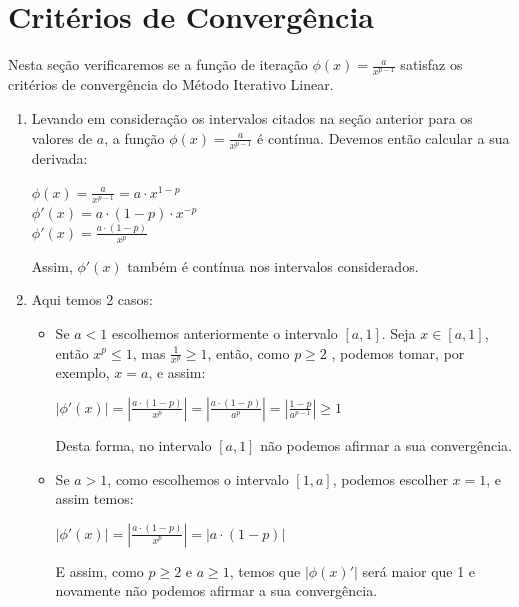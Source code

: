 \documentclass[11pt, openright, a4paper, brazil, openany, oneside]{abntex2}
\begin{document}
\section{Critérios de Convergência}

Nesta seção verificaremos se a função de iteração $ \phi (x) = \frac{a}{x^{p-1}} $ satisfaz os critérios de convergência do Método Iterativo Linear.

\begin{enumerate}

\item Levando em consideração os intervalos citados na seção anterior para os valores de $a$, a função $ \phi (x) = \frac{a}{x^{p-1}} $ é contínua. Devemos então calcular a sua derivada:
\begin{center}
$ \phi (x) = \frac{a}{x^{p-1}} = a \cdot x^{1-p} $ \\ $ \phi ' (x) = a \cdot (1-p) \cdot x^{-p}$ \\  $ \phi ' (x) = \frac {a \cdot (1-p)}{x^p}$

\end{center}

Assim, $ \phi '(x) $ também é contínua nos intervalos considerados.

\item Aqui temos 2 casos:

\begin{itemize}

\item Se $a<1$ escolhemos anteriormente o intervalo $[a,1]$. Seja $x \in [a,1]$, então $x^p\le 1$, mas $\frac{1}{x^p}\geq1$, então, como $p\geq2$ , podemos tomar, por exemplo, $x=a$, e assim:

\begin{center}

$ \left| \phi ' (x)\right| = \left| \frac {a \cdot (1-p)}{x^p} \right|= \left| \frac {a \cdot (1-p)}{a^p} \right| = \left|\frac{1-p}{a^{p-1}} \right| \geq1$

\end{center}

Desta forma, no intervalo $[a,1]$ não podemos afirmar a sua convergência.

\item Se $a>1$, como escolhemos o intervalo $[1,a]$, podemos escolher $x=1$, e assim temos:

\begin{center}

 $ \left| \phi ' (x)\right| = \left| \frac {a \cdot (1-p)}{x^p} \right| = \left| a \cdot (1-p)\right|$

\end{center}

E assim, como $p\geq2$ e $a\geq1$, temos que $|\phi(x)'|$ será maior que 1 e novamente não podemos afirmar a sua convergência.

\end{itemize}

\end{enumerate}
\end{document}
